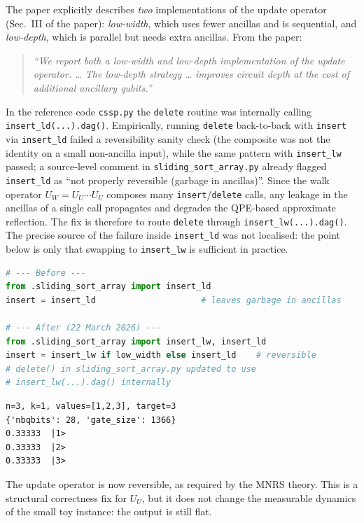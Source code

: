 \documentclass[11pt,a4paper]{article}
\begin{document}
The paper explicitly describes \emph{two} implementations of the
update operator (Sec.~III of the paper): \emph{low-width}, which uses
fewer ancillas and is sequential, and \emph{low-depth}, which is
parallel but needs extra ancillas. From the paper:
\begin{quote}
\itshape
``We report both a low-width and low-depth implementation of the
update operator. \ldots{} The low-depth strategy \ldots{} improves
circuit depth at the cost of additional ancillary qubits.''
\end{quote}
In the reference code \texttt{cssp.py} the \texttt{delete} routine
was internally calling \texttt{insert\_ld(...).dag()}. Empirically,
running \texttt{delete} back-to-back with \texttt{insert} via
\texttt{insert\_ld} failed a reversibility sanity check (the
composite was not the identity on a small non-ancilla input), while
the same pattern with \texttt{insert\_lw} passed; a source-level
comment in \texttt{sliding\_sort\_array.py} already flagged
\texttt{insert\_ld} as ``not properly reversible (garbage in
ancillas)''. Since the walk operator
$U_W = U_U\cdots U_U$ composes many \texttt{insert}/\texttt{delete}
calls, any leakage in the ancillas of a single call propagates and
degrades the QPE-based approximate reflection. The fix is therefore
to route \texttt{delete} through \texttt{insert\_lw(...).dag()}.
The precise source of the failure inside \texttt{insert\_ld} was not
localised: the point below is only that swapping to
\texttt{insert\_lw} is sufficient in practice.

\begin{lstlisting}[language=Python]
# --- Before ---
from .sliding_sort_array import insert_ld
insert = insert_ld                     # leaves garbage in ancillas

# --- After (22 March 2026) ---
from .sliding_sort_array import insert_lw, insert_ld
insert = insert_lw if low_width else insert_ld    # reversible
# delete() in sliding_sort_array.py updated to use
# insert_lw(...).dag() internally
\end{lstlisting}

\begin{lstlisting}[style=plain]
n=3, k=1, values=[1,2,3], target=3
{'nbqbits': 28, 'gate_size': 1366}
0.33333  |1>
0.33333  |2>
0.33333  |3>
\end{lstlisting}

The update operator is now reversible, as required by the MNRS theory.
This is a structural correctness fix for $U_U$, but it does not change
the measurable dynamics of the small toy instance: the output is still
flat.
\end{document}
